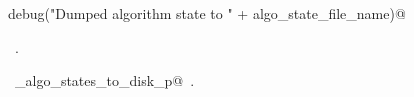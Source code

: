\documentclass[11.5pt]{report}
\begin{document}
\begin{flushleft}
\begin{list}{}{}
\mbox{}\verb@     debug("Dumped algorithm state to " + algo_state_file_name)@\\
\mbox{}\verb@@{\NWsep}
\end{list}
\vspace{-1.5ex}
\footnotesize
\begin{list}{}{\setlength{\itemsep}{-\parsep}\setlength{\itemindent}{-\leftmargin}}
\item \NWtxtMacroRefIn\ .
\item \NWtxtIdentsUsed\nobreak\  \verb@write_algo_states_to_disk_p@\nobreak\ .
\item{}
\end{list}
\vspace{4ex}
\end{flushleft}
\vspace{-0.4cm}
\end{document}
